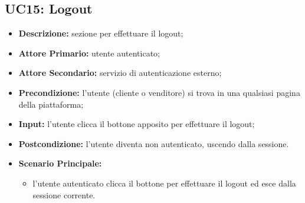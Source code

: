 \subsection{UC15: Logout}
\label{sec:UC15}
\begin{itemize}
    \item \textbf{Descrizione:} sezione per effettuare il logout;
    \item \textbf{Attore Primario:} utente autenticato;
    \item \textbf{Attore Secondario:} servizio di autenticazione esterno;
    \item \textbf{Precondizione:} l'utente (cliente o venditore) si trova in una qualsiasi pagina della piattaforma;
    \item \textbf{Input:} l'utente clicca il bottone apposito per effettuare il logout;
    \item \textbf{Postcondizione:} l'utente diventa non autenticato, uscendo dalla sessione.
    \item \textbf{Scenario Principale:}
          \begin{itemize}
              \item l'utente autenticato clicca il bottone per effettuare il logout ed esce dalla sessione corrente.
          \end{itemize}
\end{itemize}